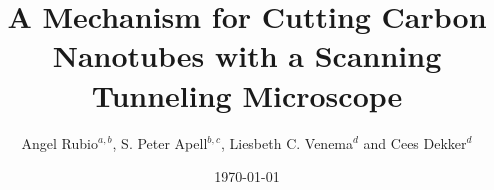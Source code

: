 %
%
%
%
%
%
%
%
%
%
%
%
\newcommand{\be}{\begin{equation}}
\newcommand{\ee}{\end{equation}}
\newcommand{\bea}{\begin{eqnarray}}
\newcommand{\eea}{\end{eqnarray}}
\newcommand{\ba}{\begin{array}}
\newcommand{\ea}{\end{array}}
\newcommand{\half}{\frac{1}{2}}


\draft

\title{A Mechanism for Cutting Carbon Nanotubes with a Scanning Tunneling Microscope}
\author{
Angel Rubio$^{a,b}$,
S. Peter Apell$^{b,c}$,
Liesbeth C. Venema$^{d}$ and Cees Dekker$^{d}$}
\bigskip
\address{
a. Departamento de F\'{\i}sica Te\'orica, Universidad de Valladolid,
   E-47011 Valladolid, Spain\\
b. Departamento de F\'{\i}sica de Materiales, Euskal Herriko Unibertsitatea
   Aptdo. 1072 San Sebastian 20080, Basque Country \\
   and Donostia International Physics Center, San Sebastian, Spain \\
c. Department of Applied Physics, Chalmers University of Technology
   and G\"{o}teborg University, S-41296 G\"{o}teborg, Sweden \\
d. Department  of Applied Sciences and DIMES, Delft University of
   Technology, Lorentzweg 1, 2628 CJ Delft, The Netherlands }
\date{\today}
\maketitle

